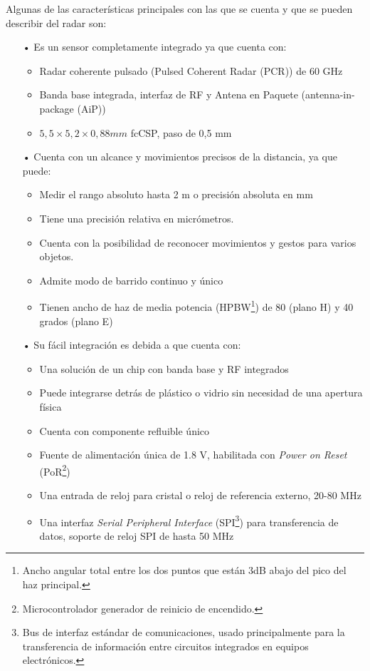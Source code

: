 Algunas de las características principales con las que se cuenta y que se pueden describir del radar son:

\begin{itemize}
    \item[•] Es un sensor completamente integrado ya que cuenta con:
    \begin{itemize}
        \item Radar coherente pulsado (Pulsed Coherent Radar (PCR)) de 60 GHz
        \item Banda base integrada, interfaz de RF y Antena en Paquete (antenna-in-package (AiP))
		\item $5,5 \times 5,2 \times 0,88 mm$ fcCSP, paso de 0,5 mm
    \end{itemize}
    \item[•] Cuenta con un alcance y movimientos precisos de la distancia, ya que puede:
    \begin{itemize}
        \item Medir el rango absoluto hasta 2 m o precisión absoluta en mm
		\item Tiene una precisión relativa en micrómetros.
		\item Cuenta con la posibilidad de reconocer movimientos y gestos para varios objetos.
		\item Admite modo de barrido continuo y único
		\item Tienen ancho de haz de media potencia (HPBW\footnote{Ancho angular total entre los dos puntos que están 3dB abajo del pico del haz principal.}) de 80 (plano H) y 40 grados (plano E)
    \end{itemize}
    \item[•] Su fácil integración es debida a que cuenta con:
    \begin{itemize}
        \item Una solución de un chip con banda base y RF integrados
		\item Puede integrarse detrás de plástico o vidrio sin necesidad de una apertura física
		\item Cuenta con componente refluible único
		\item Fuente de alimentación única de 1.8 V, habilitada con \textit{Power on Reset} (PoR\footnote{Microcontrolador generador de reinicio de encendido.})
		\item Una entrada de reloj para cristal o reloj de referencia externo, 20-80 MHz
		\item Una interfaz \textit{Serial Peripheral Interface} (SPI\footnote{Bus de interfaz estándar de comunicaciones, usado principalmente para la transferencia de información entre circuitos integrados en equipos electrónicos.}) para transferencia de datos, soporte de reloj SPI de hasta 50 MHz
    \end{itemize}
\end{itemize}

